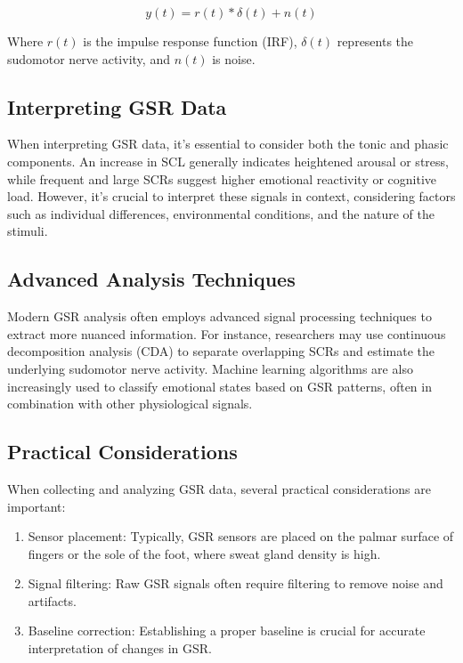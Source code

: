 \documentclass[twocolumn]{article}
\begin{document}
\[
y(t) = r(t) * \delta(t) + n(t)
\]

Where $r(t)$ is the impulse response function (IRF), $\delta(t)$ represents the sudomotor nerve activity, and $n(t)$ is noise.

\subsection{Interpreting GSR Data}
When interpreting GSR data, it's essential to consider both the tonic and phasic components. An increase in SCL generally indicates heightened arousal or stress, while frequent and large SCRs suggest higher emotional reactivity or cognitive load. However, it's crucial to interpret these signals in context, considering factors such as individual differences, environmental conditions, and the nature of the stimuli.\cite{Hernando-Gallego_Luengo_Artés-Rodríguez_2018}

\subsection{Advanced Analysis Techniques}
Modern GSR analysis often employs advanced signal processing techniques to extract more nuanced information. For instance, researchers may use continuous decomposition analysis (CDA) to separate overlapping SCRs and estimate the underlying sudomotor nerve activity. Machine learning algorithms are also increasingly used to classify emotional states based on GSR patterns, often in combination with other physiological signals.

\subsection{Practical Considerations}
When collecting and analyzing GSR data, several practical considerations are important:

\begin{enumerate}
    \item Sensor placement: Typically, GSR sensors are placed on the palmar surface of fingers or the sole of the foot, where sweat gland density is high.\cite{Hernando-Gallego_Luengo_Artés-Rodríguez_2018}
    \item Signal filtering: Raw GSR signals often require filtering to remove noise and artifacts.\cite{Hernando-Gallego_Luengo_Artés-Rodríguez_2018}
    \item Baseline correction: Establishing a proper baseline is crucial for accurate interpretation of changes in GSR.\cite{Hernando-Gallego_Luengo_Artés-Rodríguez_2018}
\end{enumerate}
\end{document}
